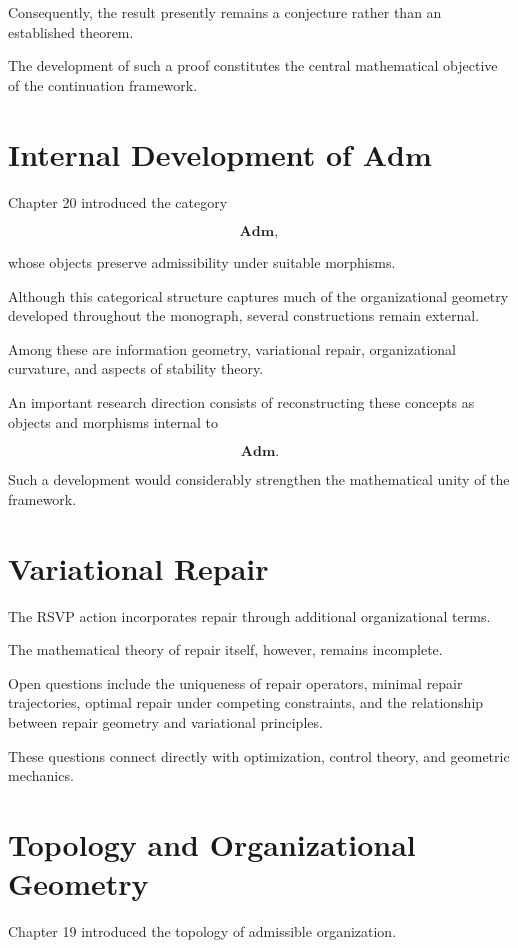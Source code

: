 \documentclass[11pt,oneside]{book}
\numberwithin{equation}{chapter}
\theoremstyle{definition}
\theoremstyle{plain}
\begin{document}
Consequently, the result presently remains a conjecture rather than an
established theorem.

The development of such a proof constitutes the central mathematical
objective of the continuation framework.

\section{Internal Development of \texorpdfstring{$\mathbf{Adm}$}{Adm}}

Chapter 20 introduced the category

\[
\mathbf{Adm},
\]

whose objects preserve admissibility under suitable morphisms.

Although this categorical structure captures much of the organizational
geometry developed throughout the monograph, several constructions remain
external.

Among these are information geometry, variational repair, organizational
curvature, and aspects of stability theory.

An important research direction consists of reconstructing these concepts
as objects and morphisms internal to

\[
\mathbf{Adm}.
\]

Such a development would considerably strengthen the mathematical unity of
the framework.

\section{Variational Repair}

The RSVP action incorporates repair through additional organizational
terms.

The mathematical theory of repair itself, however, remains incomplete.

Open questions include the uniqueness of repair operators, minimal repair
trajectories, optimal repair under competing constraints, and the
relationship between repair geometry and variational principles.

These questions connect directly with optimization, control theory, and
geometric mechanics.

\section{Topology and Organizational Geometry}

Chapter 19 introduced the topology of admissible organization.
\end{document}
